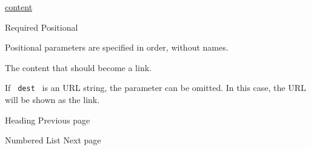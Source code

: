\href{/docs/reference/foundations/content/}{content}

{Required} {{ Positional }}

\label{parameters-body-positional-tooltip}
Positional parameters are specified in order, without names.

The content that should become a link.

If \texttt{\ dest\ } is an URL string, the parameter can be omitted. In
this case, the URL will be shown as the link.

\href{/docs/reference/model/heading/}{\pandocbounded{}}

{ Heading } { Previous page }

\href{/docs/reference/model/enum/}{\pandocbounded{}}

{ Numbered List } { Next page }
